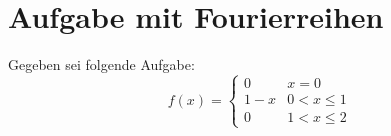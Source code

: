 



\section{Aufgabe mit Fourierreihen}
Gegeben sei folgende Aufgabe: 
\[ f(x) = \left\{\begin{array}{ll}
0     & x=0\\
1 - x & 0 < x \leq 1\\
0     & 1 < x \leq 2
\end{array}\right. \]

